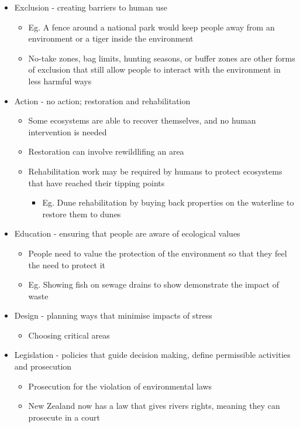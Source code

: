 		\begin{itemize}
			\item Exclusion - creating barriers to human use
				\begin{itemize}
					\item Eg. A fence around a national park would keep people away from an environment or a tiger inside the environment
					\item No-take zones, bag limits, hunting seasons, or buffer zones are other forms of exclusion that still allow people to interact with the environment in less harmful ways
				\end{itemize}

			\item Action - no action; restoration and rehabilitation
				\begin{itemize}
					\item Some ecosystems are able to recover themselves, and no human intervention is needed
					\item Restoration can involve rewildlifing an area
					\item Rehabilitation work may be required by humans to protect ecosystems that have reached their tipping points
						\begin{itemize}
							\item Eg. Dune rehabilitation by buying back properties on the waterline to restore them to dunes
						\end{itemize}
				\end{itemize}

			\item Education - ensuring that people are aware of ecological values
				\begin{itemize}
					\item People need to value the protection of the environment so that they feel the need to protect it
					\item Eg. Showing fish on sewage drains to show demonstrate the impact of waste
				\end{itemize}
			\item Design - planning ways that minimise impacts of stress
				\begin{itemize}
					\item Choosing critical areas
				\end{itemize}

			\item Legislation - policies that guide decision making, define permissible activities and prosecution
				\begin{itemize}
					\item Prosecution for the violation of environmental laws
					\item New Zealand now has a law that gives rivers rights, meaning they can prosecute in a court
				\end{itemize}
		\end{itemize}

